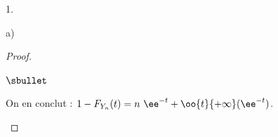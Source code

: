 \documentclass[11pt]{article}%
\begin{document}
\begin{noliste}{1.}
\begin{noliste}{a)}
\begin{proof}
\begin{noliste}{$\sbullet$}


        \newpage


      \item On en conclut : $1-F_{Y_n}(t) = n \ \ee^{-t} +
        \oo{t}{+\infty}(\ee^{-t})$. %
      \end{noliste}


\end{proof}
\end{noliste}
\end{noliste}
\end{document}
